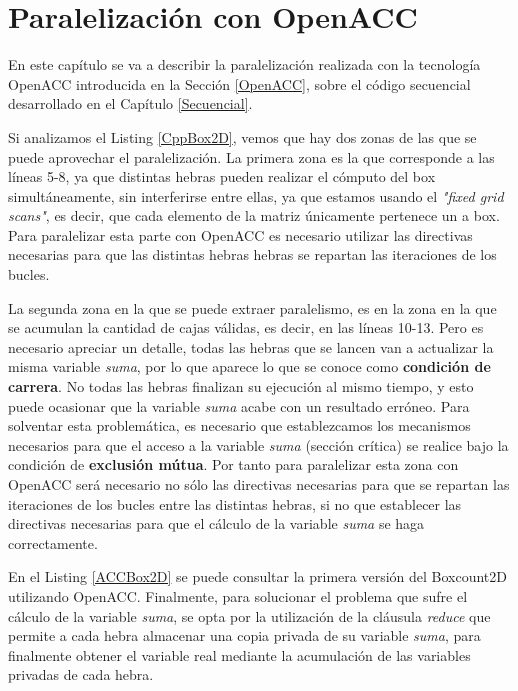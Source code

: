 \chapter{Paralelización con OpenACC}

En este capítulo se va a describir la paralelización realizada con la tecnología OpenACC introducida en la Sección \ref{OpenACC}, sobre el código secuencial desarrollado en el Capítulo \ref{Secuencial}.

Si analizamos el Listing \ref{CppBox2D}, vemos que hay dos zonas de las que se puede aprovechar el paralelización. La primera zona es la que corresponde a las líneas 5-8, ya que distintas hebras pueden realizar el cómputo del box simultáneamente, sin interferirse entre ellas, ya que estamos usando el \textit{"fixed grid scans"}, es decir, que cada elemento de la matriz únicamente pertenece un a box. Para paralelizar esta parte con OpenACC es necesario utilizar las directivas necesarias para que las distintas hebras hebras se repartan las iteraciones de los bucles.

La segunda zona en la que se puede extraer paralelismo, es en la zona en la que se acumulan la cantidad de cajas válidas, es decir, en las líneas 10-13. Pero es necesario apreciar un detalle, todas las hebras que se lancen van a actualizar la misma variable \textit{suma}, por lo que aparece lo que se conoce como \textbf{condición de carrera}. No todas las hebras finalizan su ejecución al mismo tiempo, y esto puede ocasionar que la variable \textit{suma} acabe con un resultado erróneo. Para solventar esta problemática, es necesario que establezcamos los mecanismos necesarios para que el acceso a la variable \textit{suma} (sección crítica) se realice bajo la condición de \textbf{exclusión mútua}. Por tanto para paralelizar esta zona con OpenACC será necesario no sólo las directivas necesarias para que se repartan las iteraciones de los bucles entre las distintas hebras, si no que establecer las directivas necesarias para que el cálculo de la variable \textit{suma} se haga correctamente.

En el Listing \ref{ACCBox2D} se puede consultar la primera versión del Boxcount2D utilizando OpenACC. Finalmente, para solucionar el problema que sufre el cálculo de la variable \textit{suma}, se opta por la utilización de la cláusula \textit{reduce} que permite a cada hebra almacenar una copia privada de su variable \textit{suma}, para finalmente obtener el variable real mediante la acumulación de las variables privadas de cada hebra.


